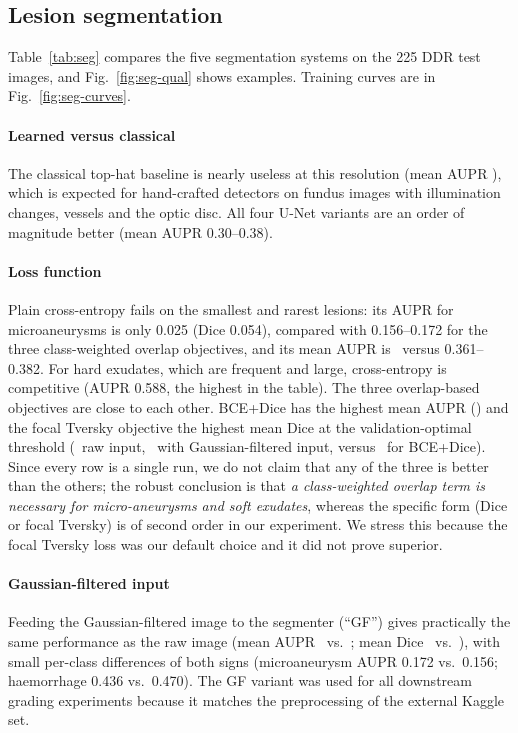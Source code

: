 \subsection{Lesion segmentation}
\label{sec:res-seg}
Table~\ref{tab:seg} compares the five segmentation systems on the 225 DDR test images, and Fig.~\ref{fig:seg-qual} shows examples. Training curves are in Fig.~\ref{fig:seg-curves}.

\paragraph{Learned versus classical} The classical top-hat baseline is nearly useless at this resolution (mean AUPR \nSegAUPRMorph), which is expected for hand-crafted detectors on fundus images with illumination changes, vessels and the optic disc. All four U-Net variants are an order of magnitude better (mean AUPR 0.30--0.38).

\paragraph{Loss function} Plain cross-entropy fails on the smallest and rarest lesions: its AUPR for microaneurysms is only 0.025 (Dice 0.054), compared with 0.156--0.172 for the three class-weighted overlap objectives, and its mean AUPR is \nSegAUPRBce\ versus 0.361--0.382. For hard exudates, which are frequent and large, cross-entropy is competitive (AUPR 0.588, the highest in the table). The three overlap-based objectives are close to each other. BCE+Dice has the highest mean AUPR (\nSegAUPRBcedice) and the focal Tversky objective the highest mean Dice at the validation-optimal threshold (\nSegDiceFtl\ raw input, \nSegDiceFtlbg\ with Gaussian-filtered input, versus \nSegDiceBcedice\ for BCE+Dice). Since every row is a single run, we do not claim that any of the three is better than the others; the robust conclusion is that \emph{a class-weighted overlap term is necessary for micro-aneurysms and soft exudates}, whereas the specific form (Dice or focal Tversky) is of second order in our experiment. We stress this because the focal Tversky loss was our default choice and it did not prove superior.

\paragraph{Gaussian-filtered input} Feeding the Gaussian-filtered image to the segmenter (``GF'') gives practically the same performance as the raw image (mean AUPR \nSegAUPRFtlbg\ vs.\ \nSegAUPRFtl; mean Dice \nSegDiceFtlbg\ vs.\ \nSegDiceFtl), with small per-class differences of both signs (microaneurysm AUPR 0.172 vs.\ 0.156; haemorrhage 0.436 vs.\ 0.470). The GF variant was used for all downstream grading experiments because it matches the preprocessing of the external Kaggle set.

